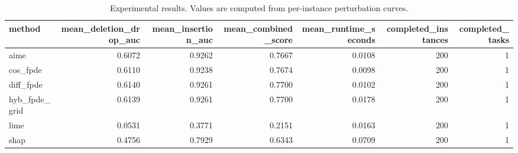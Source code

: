 \begin{table}[t]
\caption{Experimental results. Values are computed from per-instance perturbation curves.}
\label{tab:main_results_computed}
\centering
\begin{tabular}{lrrrrrr}
\toprule
method & mean\_deletion\_drop\_auc & mean\_insertion\_auc & mean\_combined\_score & mean\_runtime\_seconds & completed\_instances & completed\_tasks \\
\midrule
aime & 0.6072 & 0.9262 & 0.7667 & 0.0108 & 200 & 1 \\
cos\_fpde & 0.6110 & 0.9238 & 0.7674 & 0.0098 & 200 & 1 \\
diff\_fpde & 0.6140 & 0.9261 & 0.7700 & 0.0102 & 200 & 1 \\
hyb\_fpde\_grid & 0.6139 & 0.9261 & 0.7700 & 0.0178 & 200 & 1 \\
lime & 0.0531 & 0.3771 & 0.2151 & 0.0163 & 200 & 1 \\
shap & 0.4756 & 0.7929 & 0.6343 & 0.0709 & 200 & 1 \\
\bottomrule
\end{tabular}

\end{table}
